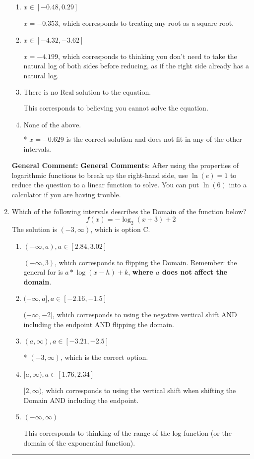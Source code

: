 \documentclass{extbook}[14pt]
\newcommand{\litem}[1]{\item #1

\rule{\textwidth}{0.4pt}}
\begin{document}
\begin{enumerate}
{\begin{enumerate}[label=\Alph*.]
$x = 0.629$, which is the negative of the correct solution.
\item \( x \in [-0.48, 0.29] \)

$x = -0.353$, which corresponds to treating any root as a square root.
\item \( x \in [-4.32, -3.62] \)

$x = -4.199$, which corresponds to thinking you don't need to take the natural log of both sides before reducing, as if the right side already has a natural log.
\item \( \text{There is no Real solution to the equation.} \)

This corresponds to believing you cannot solve the equation.
\item \( \text{None of the above.} \)

* $x = -0.629$ is the correct solution and does not fit in any of the other intervals.
\end{enumerate}

\textbf{General Comment:} \textbf{General Comments}: After using the properties of logarithmic functions to break up the right-hand side, use $\ln(e) = 1$ to reduce the question to a linear function to solve. You can put $\ln(6)$ into a calculator if you are having trouble.
}
\litem{
Which of the following intervals describes the Domain of the function below?
\[ f(x) = -\log_2{(x+3)}+2 \]The solution is \( (-3, \infty) \), which is option C.\begin{enumerate}[label=\Alph*.]
\item \( (-\infty, a), a \in [2.84, 3.02] \)

$(-\infty, 3)$, which corresponds to flipping the Domain. Remember: the general for is $a*\log(x-h)+k$, \textbf{where $a$ does not affect the domain}.
\item \( (-\infty, a], a \in [-2.16, -1.5] \)

$(-\infty, -2]$, which corresponds to using the negative vertical shift AND including the endpoint AND flipping the domain.
\item \( (a, \infty), a \in [-3.21, -2.5] \)

* $(-3, \infty)$, which is the correct option.
\item \( [a, \infty), a \in [1.76, 2.34] \)

$[2, \infty)$, which corresponds to using the vertical shift when shifting the Domain AND including the endpoint.
\item \( (-\infty, \infty) \)

This corresponds to thinking of the range of the log function (or the domain of the exponential function).
\end{enumerate}

}
\end{enumerate}
\end{document}
